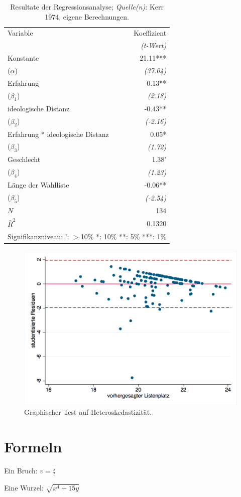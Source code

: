 \documentclass[paper=a4    %
,twoside=false             %
,fontsize=12pt             %
,DIV=11                    %
,parskip=half		   %
]{scrartcl}
\begin{document}
\begin{table}[tb!]
	\begin{center}
		\begin{tabular}{@{}lr@{}}
		\toprule
		Variable 	&	Koeffizient\\ 
		& \emph{(t-Wert)} \\
		\midrule
		Konstante & 21.11*** \\
		($\alpha$) & \emph{(37.04)} \\
		Erfahrung & 0.13**\\ 
		($\beta_{1}$) & \emph{(2.18)}  \\
		ideologische Distanz & -0.43** \\
		($\beta_{2}$) &\emph{(-2.16)}  \\
		Erfahrung * ideologische Distanz & 0.05* \\
		($\beta_{3}$) & \emph{(1.72)}  \\ \hline
		Geschlecht &  1.38'\\
		($\beta_{4}$) &   \emph{(1.23)}  \\
		L\"ange der Wahlliste &   -0.06**\\
		($\beta_{5}$) &  \emph{(-2.54)}  \\ \midrule
		 $N$  & 134\\
		 $\bar R^{2}$ &  0.1320\\ 
		\bottomrule
		\multicolumn{2}{l}{\small{Signifikanzniveau: ': $ >$10\% *: 10\% **: 5\% ***: 1\%}}
		\end{tabular}
		\caption{Resultate der Regressionsanalyse;
		  \textit{Quelle(n)}: Kerr 1974, eigene Berechnungen.}
		\label{reg}
	\end{center}
\end{table}
\begin{figure}[t!]
	\begin{center}
		\includegraphics[width=15cm]{diag1.png}
		\caption{Graphischer Test auf Heteroskedastizit\"at.}
		\label{diag1}
	\end{center}
\end{figure}
\section{Formeln}

Ein Bruch: $v = \frac{s}{t}$ \\

\vspace{.5\lineskip}

Eine Wurzel: $\sqrt{x^{4}+15y}$
\end{document}
